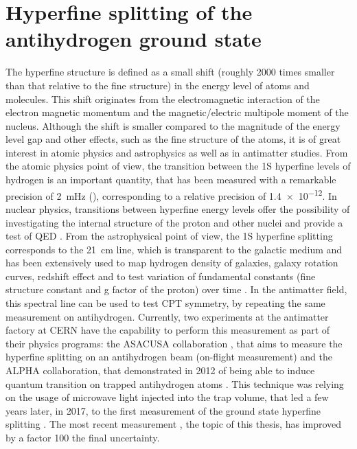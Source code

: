 \chapter{Hyperfine splitting of the antihydrogen ground state}
\label{ch:hyperfine}

The hyperfine structure is defined as a small shift (roughly 2000 times smaller than that relative to the fine structure) in the energy level of atoms and molecules. This shift originates from the electromagnetic interaction of the electron magnetic momentum and the magnetic/electric multipole moment of the nucleus. Although the shift is smaller compared to the magnitude of the energy level gap and other effects, such as the fine structure of the atoms, it is of great interest in atomic physics and astrophysics as well as in antimatter studies. From the atomic physics point of view, the transition between the 1S hyperfine levels of hydrogen is an important quantity, that has been measured with a remarkable precision of \SI{2}{\milli \hertz} (\cite{bestHFShydrogen}), corresponding to a relative precision of \num{1.4e-12}. In nuclear physics, transitions between hyperfine energy levels offer the possibility of investigating the internal structure of the proton and other nuclei and provide a test of QED \cite{Karshenboim:2005iy}. From the astrophysical point of view, the 1S hyperfine splitting corresponds to the \SI{21}{\centi \meter} line, which is transparent to the galactic medium and has been extensively used to map hydrogen density of galaxies, galaxy rotation curves, redshift effect \cite{Dickeyarticle} and to test variation of fundamental constants (fine structure constant and g factor of the proton) over time \cite{Khatri_2007}. In the antimatter field, this spectral line can be used to test CPT symmetry, by repeating the same measurement on antihydrogen. Currently, two experiments at the antimatter factory at CERN have the capability to perform this measurement as part of their physics programs: the ASACUSA collaboration \cite{Diermaier:2016fsy}, that aims to measure the hyperfine splitting on an antihydrogen beam (on-flight measurement) and the ALPHA collaboration, that demonstrated in 2012 of being able to induce quantum transition on trapped antihydrogen atoms \cite{ALPHA:2012kaf}. This technique was relying on the usage of microwave light injected into the trap volume, that led a few years later, in 2017, to the first measurement of the ground state hyperfine splitting \cite{ALPHA:2017fsh}. The most recent measurement \cite{ALPHA:2026lbu}, the topic of this thesis, has improved by a factor 100 the final uncertainty.
